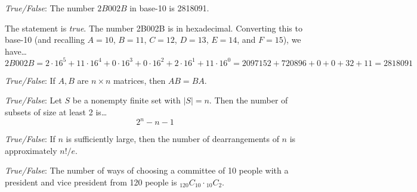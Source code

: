 \documentclass[11pt,letterpaper]{article}
\begin{document}
\quizsol \textit{True/False}: The number $2B002B$ in base-10 is 2818091. \pspace 

\sol The statement is \textit{true}. The number 2B002B is in hexadecimal. Converting this to base-10 (and recalling $A= 10$, $B= 11$, $C= 12$, $D= 13$, $E= 14$, and $F= 15$), we have\dots
	\[
	2B002B= 2 \cdot 16^5 + 11 \cdot 16^4 + 0 \cdot 16^3 + 0 \cdot 16^2 + 2 \cdot 16^1 + 11 \cdot 16^0= 2097152 + 720896 + 0 + 0 + 32 + 11= 2818091
	\]



\quizsol \textit{True/False}: If $A, B$ are $n \times n$ matrices, then $AB= BA$. \pspace

\quizsol \textit{True/False}: Let $S$ be a nonempty finite set with $|S|= n$. Then the number of subsets of size at least 2 is\dots
	\[
	2^n - n - 1
	\]

\quizsol \textit{True/False}: If $n$ is sufficiently large, then the number of dearrangements of $n$ is approximately $n!/e$.


\quizsol \textit{True/False}: The number of ways of choosing a committee of 10 people with a president and vice president from 120 people is $_{120}C_{10} \cdot \phantom{}_{10} C_2$. 









\end{document}
